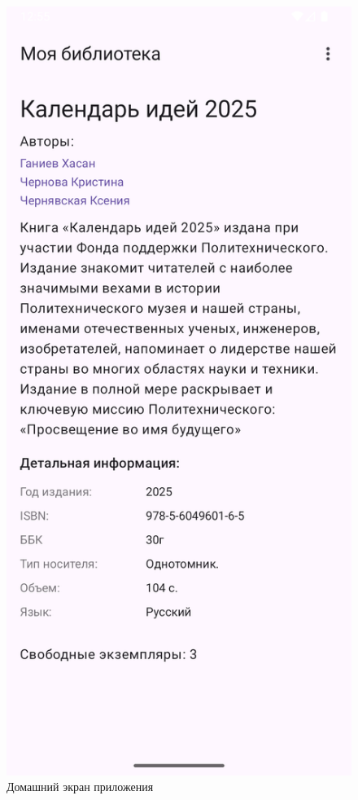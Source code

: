 \begin{figure}[H]
	\includegraphics[scale=0.15]{img/book_detail.png}
	\caption{Домашний экран приложения}
	\label{fig:home}
\end{figure}

